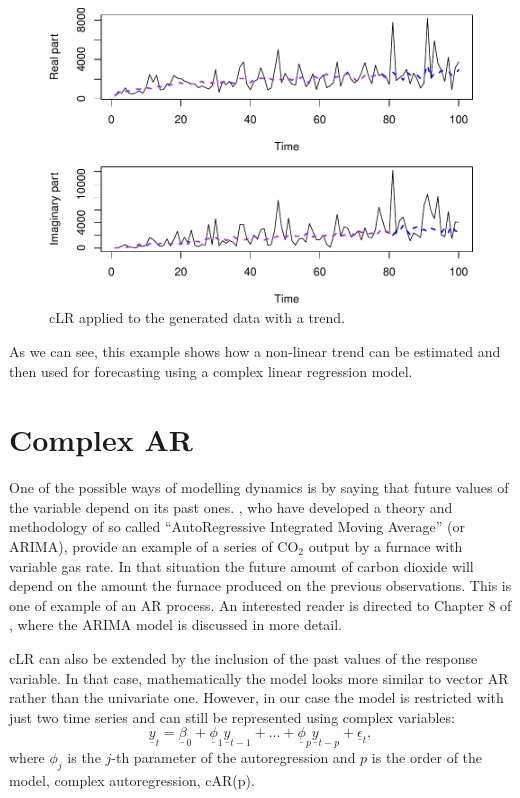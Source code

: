 \documentclass[
]{book}
\begin{document}
\begin{figure}
\centering
\includegraphics{Svetunkov---Svetunkov---Complex-Valued-Econometrics_files/figure-latex/dataWithTrendForecast-1.pdf}
\caption{\label{fig:dataWithTrendForecast}cLR applied to the generated data with a trend.}
\end{figure}

As we can see, this example shows how a non-linear trend can be estimated and then used for forecasting using a complex linear regression model.

\hypertarget{complex-ar}{%
\section{Complex AR}\label{complex-ar}}

One of the possible ways of modelling dynamics is by saying that future values of the variable depend on its past ones. \citet{Box1976}, who have developed a theory and methodology of so called ``AutoRegressive Integrated Moving Average'' (or ARIMA), provide an example of a series of CO\(_2\) output by a furnace with variable gas rate. In that situation the future amount of carbon dioxide will depend on the amount the furnace produced on the previous observations. This is one of example of an AR process. An interested reader is directed to Chapter 8 of \citet{SvetunkovAdam}, where the ARIMA model is discussed in more detail.

cLR can also be extended by the inclusion of the past values of the response variable. In that case, mathematically the model looks more similar to vector AR rather than the univariate one. However, in our case the model is restricted with just two time series and can still be represented using complex variables:
\begin{equation}
    \underline{y}_t = \underline{\beta}_0 + \underline{\phi}_1 \underline{y}_{t-1} + \dots + \underline{\phi}_p \underline{y}_{t-p} + \underline{\epsilon}_t ,
    \label{eq:ComplexAR}
\end{equation}
where \(\phi_j\) is the \(j\)-th parameter of the autoregression and \(p\) is the order of the model, complex autoregression, cAR(p).
\end{document}

